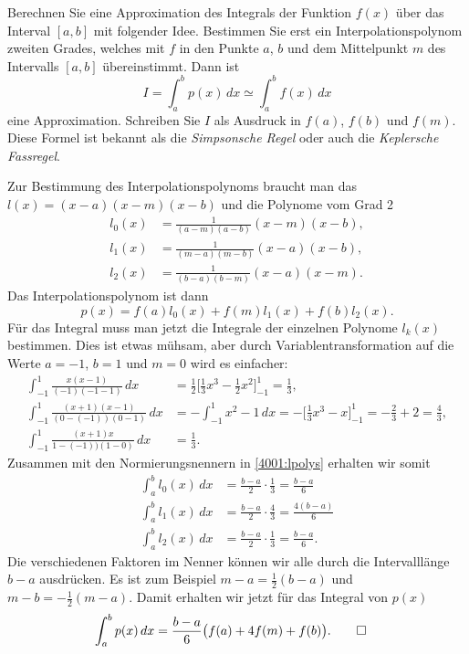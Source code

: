 Berechnen Sie eine Approximation des Integrals der Funktion
$f(x)$ über das Interval $[a,b]$ mit folgender Idee.
Bestimmen Sie erst ein Interpolationspolynom zweiten Grades, welches
mit $f$ in den Punkte $a$, $b$ und dem Mittelpunkt $m$ des Intervalls
$[a,b]$ übereinstimmt.
Dann ist
\[
I=\int_a^b p(x)\,dx
\simeq
\int_a^b f(x)\,dx
\]
eine Approximation.
Schreiben Sie $I$ als Ausdruck in $f(a)$, $f(b)$ und $f(m)$.
Diese Formel ist bekannt als die {\em Simpsonsche Regel} 
%
oder auch die
{\em Keplersche Fassregel}.
%
%


\begin{loesung}
Zur Bestimmung des Interpolationspolynoms braucht man das
$l(x) = (x-a)(x-m)(x-b)$ und die Polynome vom Grad 2
\begin{equation}
\begin{aligned}
l_0(x) &= \frac1{(a-m)(a-b)} (x-m)(x-b),
\\
l_1(x) &= \frac1{(m-a)(m-b)} (x-a)(x-b),
\\
l_2(x) &= \frac1{(b-a)(b-m)} (x-a)(x-m).
\end{aligned}
\label{4001:lpolys}
\end{equation}
Das Interpolationspolynom ist dann
\[
p(x) = f(a) l_0(x) + f(m) l_1(x) + f(b) l_2(x).
\]
Für das Integral muss man jetzt die Integrale der einzelnen Polynome 
$l_k(x)$ bestimmen.
Dies ist etwas mühsam, aber durch Variablentransformation auf
die Werte $a=-1$, $b=1$ und $m=0$ wird es einfacher:
\begin{align*}
\int_{-1}^1 \frac{x(x-1)}{(-1)(-1-1)}\,dx
&=
\frac12
\biggl[\frac13x^3 -\frac12x^2\biggr]_{-1}^1
=
\frac13,
\\
\int_{-1}^1 \frac{(x+1)(x-1)}{(0-(-1))(0-1)}\,dx
&=
-\int_{-1}^1 x^2 -1 \,dx
=
-\biggl[\frac13x^3-x\biggr]_{-1}^1
=
-\frac23 + 2
=
\frac43,
\\
\int_{-1}^1 \frac{(x+1)x}{1-(-1))(1-0)}\,dx
&=
\frac13.
\end{align*}
Zusammen mit den Normierungsnennern in \eqref{4001:lpolys} erhalten wir
somit
\begin{align*}
\int_a^b l_0(x)\,dx
&=
\frac{b-a}{2}
\cdot
\frac13
=
\frac{b-a}6
\\
\int_a^b l_1(x)\,dx
&=
\frac{b-a}{2}
\cdot
\frac{4}{3}
=
\frac{4(b-a)}{6}
\\
\int_a^b l_2(x)\,dx
&=
\frac{b-a}{2}
\cdot
\frac13
=
\frac{b-a}{6}.
\end{align*}
Die verschiedenen Faktoren im Nenner können wir alle durch die
Intervalllänge $b-a$ ausdrücken. 
Es ist zum Beispiel $m-a=\frac12(b-a)$ und $m-b=-\frac12(m-a)$.
Damit erhalten wir jetzt für das Integral von $p(x)$
\begin{align*}
\int_a^b p(x)\,dx
&=
\frac{b-a}{6}\bigl(f(a) + 4f(m) + f(b)\bigr).
\qedhere
\end{align*}
\end{loesung}




